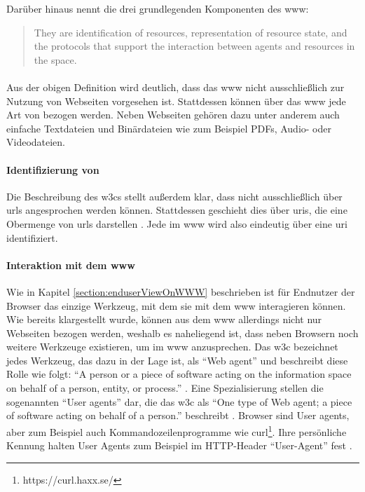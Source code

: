         Darüber hinaus nennt \cite{w3c:wwwArch} die drei grundlegenden Komponenten des \gls{www}:

        \begin{quote}
            They are identification of resources,
            representation of resource state, and the protocols
            that support the interaction between agents and resources in the space.
        \end{quote}

        \paragraph*{\resources}
        Aus der obigen Definition wird deutlich,
        dass das \gls{www} nicht ausschließlich zur Nutzung von Webseiten
        vorgesehen ist.
        Stattdessen können über das \gls{www} jede Art von {\resources} bezogen werden.
        Neben Webseiten gehören dazu unter anderem auch einfache Textdateien
        und Binärdateien wie zum Beispiel PDFs, Audio- oder Videodateien.

        \paragraph*{Identifizierung von \resources}
        Die Beschreibung des \glspl{w3c} stellt außerdem klar,
        dass {\resources} nicht ausschließlich über \glspl{url} angesprochen werden können.
        Stattdessen geschieht dies über \glspl{uri}, die eine Obermenge von \glspl{url} darstellen
        \cite[Kapitel 1.1.3, Seite 7]{rfc:3986}.
        Jede {\resource} im \gls{www} wird also eindeutig über eine \gls{uri} identifiziert.

        \paragraph*{Interaktion mit dem \gls{www}}
        Wie in Kapitel \ref{section:enduserViewOnWWW} beschrieben ist für Endnutzer
        der Browser das einzige Werkzeug, mit dem sie mit dem \gls{www}
        interagieren können. Wie bereits klargestellt wurde,
        können aus dem \gls{www} allerdings nicht nur Webseiten bezogen werden,
        weshalb es naheliegend ist, dass neben Browsern noch weitere Werkzeuge existieren,
        um {\resources} im \gls{www} anzusprechen.
        Das \gls{w3c} bezeichnet jedes Werkzeug, das dazu in der Lage ist, als
        "`Web agent"' und beschreibt diese Rolle wie folgt:
        "`A person or a piece of software acting on the information
        space on behalf of a person, entity, or process."' \cite[Kapitel 6]{w3c:wwwArch}.
        Eine Spezialisierung stellen die sogenannten "`User agents"' dar,
        die das \gls{w3c} als "`One type of Web agent;
        a piece of software acting on behalf of a person."' beschreibt \cite[Kapitel 6]{w3c:wwwArch}.
        Browser sind User agents, aber zum Beispiel auch Kommandozeilenprogramme
        wie curl\footnote{https://curl.haxx.se/}.
        Ihre persönliche Kennung halten User Agents zum Beispiel im
        HTTP-Header "`User-Agent"' fest \cite[Kapitel 5.5.3, Seite 46]{rfc:7231}.

